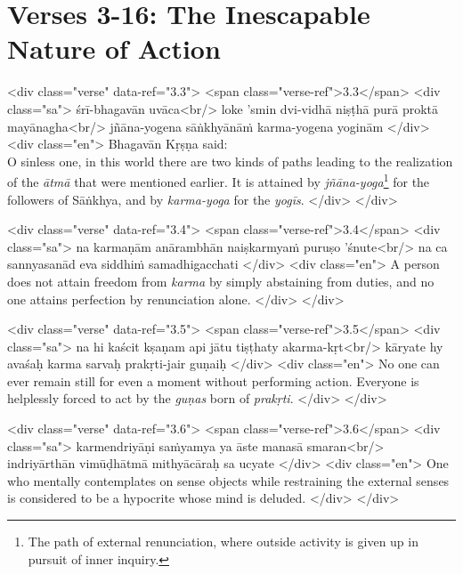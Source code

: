 \section{Verses 3-16: The Inescapable Nature of Action}\label{sec-verses-3-16-the-inescapable-nature-of-action}

\begin{html}
<div class="verse" data-ref="3.3">
  <span class="verse-ref">3.3</span>
  <div class="sa">
    śrī-bhagavān uvāca<br/>
    loke ’smin dvi-vidhā niṣṭhā purā proktā mayānagha<br/>
    jñāna-yogena sāṅkhyānāṁ karma-yogena yoginām
  </div>
  <div class="en">
    \hspace*{1em}Bhagavān Kṛṣṇa said: \\ O sinless one, in this world there are two kinds of paths leading to the realization of the \textit{ātmā} that were mentioned earlier. It is attained by \textit{jñāna-yoga}\footnote{The path of external renunciation, where outside activity is given up in pursuit of inner inquiry.} for the followers of Sāṅkhya, and by \textit{karma-yoga} for the \textit{yogīs}.
  </div>
</div>
\end{html}



\begin{html}
<div class="verse" data-ref="3.4">
  <span class="verse-ref">3.4</span>
  <div class="sa">
    na karmaṇām anārambhān naiṣkarmyaṁ puruṣo ’śnute<br/>
    na ca sannyasanād eva siddhiṁ samadhigacchati
  </div>
  <div class="en">
    A person does not attain freedom from \textit{karma} by simply abstaining from duties, and no one attains perfection by renunciation alone.
  </div>
</div>
\end{html}



\begin{html}
<div class="verse" data-ref="3.5">
  <span class="verse-ref">3.5</span>
  <div class="sa">
    na hi kaścit kṣaṇam api jātu tiṣṭhaty akarma-kṛt<br/>
    kāryate hy avaśaḥ karma sarvaḥ prakṛti-jair guṇaiḥ
  </div>
  <div class="en">
    No one can ever remain still for even a moment without performing action. Everyone is helplessly forced to act by the \textit{guṇas} born of \textit{prakṛti}.
  </div>
</div>
\end{html}



\begin{html}
<div class="verse" data-ref="3.6">
  <span class="verse-ref">3.6</span>
  <div class="sa">
    karmendriyāṇi saṁyamya ya āste manasā smaran<br/>
    indriyārthān vimūḍhātmā mithyācāraḥ sa ucyate
  </div>
  <div class="en">
    One who mentally contemplates on sense objects while restraining the external senses is considered to be a hypocrite whose mind is deluded.
  </div>
</div>
\end{html}



